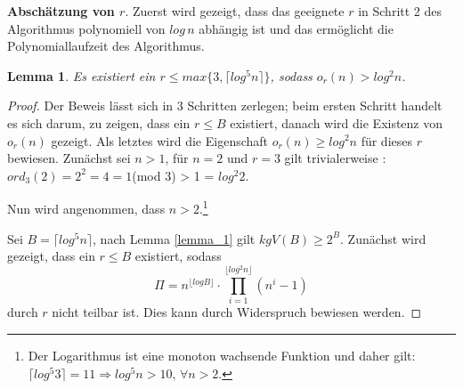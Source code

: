 \documentclass[12pt,oneside]{article}
\newtheorem{lemma}[theorem]{Lemma}
\theoremstyle{remark}
\theoremstyle{definition}
\begin{document}
\textbf{Abschätzung von $r$}.\newline
Zuerst wird gezeigt, dass das geeignete $r$ in Schritt 2 des Algorithmus polynomiell von $log \, n$ abhängig ist und das ermöglicht die Polynomiallaufzeit des Algorithmus.  

\begin{lemma}\label{limit_of_r}
Es existiert ein $ r \leq max \{ 3, \lceil log^5 n \rceil \}$, sodass $o_{r}(n) > log^2 n$.
\end{lemma}

\begin{proof}
Der Beweis lässt sich in 3 Schritten zerlegen; beim ersten Schritt handelt es sich darum, zu zeigen, dass ein $r \leq B$ existiert, danach wird die Existenz von $o_{r}(n)$ gezeigt. Als letztes wird die Eigenschaft $o_{r}(n) \geq log^2 n$ für dieses $r$ bewiesen.\newline\newline
Zunächst sei $n > 1$, für $n = 2$ und $r = 3$ gilt trivialerweise :\newline\newline $ord_{3}(2) = 2^2 = 4 = 1 $(mod 3) > 1 = $log^2 2$.

Nun wird angenommen, dass $n > 2$.\footnote{Der Logarithmus ist eine monoton wachsende Funktion und daher gilt:\newline $\lceil log^5 3 \rceil = 11 \Rightarrow log^5 n > 10, \,  \forall n > 2$.}\newline\newline

Sei $B = \lceil log^5 n \rceil$, nach Lemma \ref{lemma_1} gilt $kgV(B) \geq 2^B$. Zunächst wird gezeigt, dass   ein $r \leq B$ existiert, sodass
\begin{equation}\label{prod_cor}
     \Pi = n^{\lfloor log B \rfloor } \cdot \prod_{i = 1}^{\lfloor log^2 n \rfloor} (n^i - 1)
\end{equation}
durch $r$ nicht teilbar ist. Dies kann durch Widerspruch bewiesen werden.


\end{proof}
\end{document}
